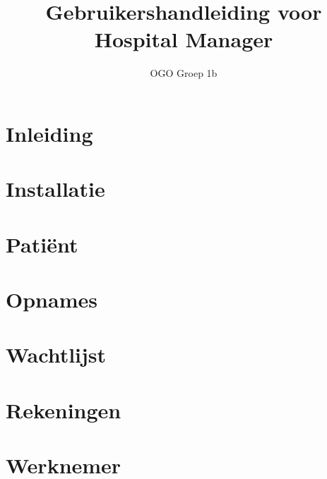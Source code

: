 \documentclass{report}
\title{Gebruikershandleiding voor Hospital Manager}
\author{ OGO Groep 1b }
\begin{document}
\maketitle

\tableofcontents

\chapter{Inleiding}\label{cha:inleiding} %




\chapter{Installatie}\label{cha:installatie} %




\chapter{Pati\"ent}\label{cha:patient} %





\chapter{Opnames}\label{cha:opnames} %





\chapter{Wachtlijst}\label{cha:wachtlijst} %




\chapter{Rekeningen}\label{cha:rekeningen} %



\chapter{Werknemer}\label{cha:werknemer} %
\end{document}
